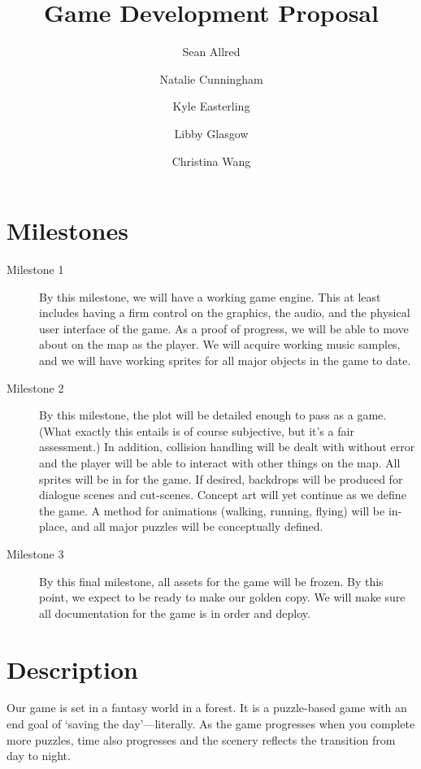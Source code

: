 \documentclass[letterpaper,twocolumn]{article}
\title{Game Development Proposal}
\author{%
  Sean Allred \and
  Natalie Cunningham \and
  Kyle Easterling \and
  Libby Glasgow \and
  Christina Wang}
\begin{document}
\maketitle

\section{Milestones}
\label{sec:milestones}

\begin{description}
\item[Milestone 1]
  By this milestone, we will have a working game engine.
  This at least includes having a firm control on
    the graphics,
    the audio,
    and the physical user interface
    of the game.
  As a proof of progress, we will be able to
    move about on the map as the player.
  We will acquire working music samples,
    and we will have working sprites for all major objects in the game to date.
\item[Milestone 2]
  By this milestone, the plot will be detailed enough to pass as a game.
  (What exactly this entails is of course subjective, but it's a fair assessment.)
  In addition, collision handling will be dealt with without error
    and the player will be able to interact with other things on the map.
  All sprites will be in for the game.
  If desired, backdrops will be produced for dialogue scenes and cut-scenes.
  Concept art will yet continue as we define the game.
  A method for animations (walking, running, flying) will be in-place, and
    all major puzzles will be conceptually defined.
\item[Milestone 3]
  By this final milestone, all assets for the game will be frozen.
  By this point, we expect to be ready to make our golden copy.
  We will make sure all documentation for the game is in order and deploy.
\end{description}

\section{Description}
\label{sec:description}

\def\GameTitle{\textit}

Our game is set in a fantasy world in a forest.
It is a puzzle-based game with an end goal of \enquote*{saving the day}---literally.
As the game progresses when you complete more puzzles,
  time also progresses and the scenery reflects the transition from day to night.
\end{document}

